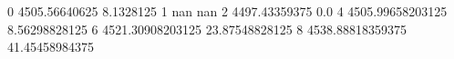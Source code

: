 0 4505.56640625 8.1328125
1 nan nan
2 4497.43359375 0.0
4 4505.99658203125 8.56298828125
6 4521.30908203125 23.87548828125
8 4538.88818359375 41.45458984375
